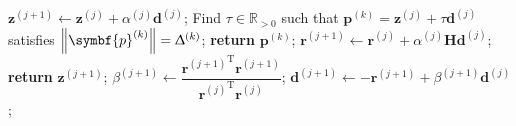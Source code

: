 \begin{algorithm}
\begin{algorithmic}[1]
                \State $\symbf{z}^{(j+1)} \gets \symbf{z}^{(j)} + \alpha^{(j)} \symbf{d}^{(j)}$;
                    \State Find $\tau \in \mathbb{R}_{>0}$ such that
                        $\symbf{p}^{(k)} = \symbf{z}^{(j)} + \tau \symbf{d}^{(j)}$
                        satisfies
                        $\left \lVert \symbf{p}^{(k)} \right \rVert = \trustradius{k}$;
                    \State \textbf{return} $\symbf{p}^{(k)}$;
                \EndIf
                \State $\symbf{r}^{(j+1)} \gets
                    \symbf{r}^{(j)} +
                    \alpha^{(j)}
                    \symbf{H}
                    \symbf{d}^{(j)}$;
                    \State \textbf{return} $\symbf{z}^{(j+1)}$;
                \EndIf
                \State $\beta^{(j+1)} \gets
                    \dfrac{{\symbf{r}^{(j+1)}}^{\mathrm{T}} \symbf{r}^{(j+1)}}{{\symbf{r}^{(j)}}^{\mathrm{T}} \symbf{r}^{(j)}}$;
                \State $\symbf{d}^{(j+1)} \gets -\symbf{r}^{(j+1)} + \beta^{(j+1)} \symbf{d}^{(j)}$;
            \EndFor
        \EndProcedure
    \end{algorithmic}
\end{algorithm}



